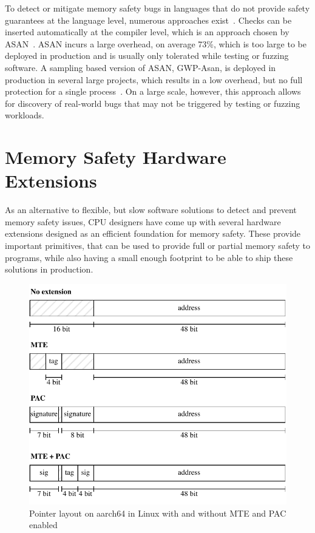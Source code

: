 To detect or mitigate memory safety bugs in languages that do not provide safety guarantees at the language level, numerous approaches exist~\cite{serebryany2012addresssanitizer,serebryany2023gwp,nethercote2007valgrind,serebryany2018memory}.
Checks can be inserted automatically at the compiler level, which is an approach chosen by \ac{ASAN}~\cite{serebryany2012addresssanitizer}.
\Ac{ASAN} incurs a large overhead, on average 73\%, which is too large to be deployed in production and is usually only tolerated while testing or fuzzing software.
A sampling based version of \ac{ASAN}, GWP-Asan, is deployed in production in several large projects, which results in a low overhead, but no full protection for a single process~\cite{serebryany2023gwp}.
On a large scale, however, this approach allows for discovery of real-world bugs that may not be triggered by testing or fuzzing workloads.

\section{Memory Safety Hardware Extensions}
\label{sec:memory-safety-hardware-extensions}

As an alternative to flexible, but slow software solutions to detect and prevent memory safety issues, CPU designers have come up with several hardware extensions designed as an efficient foundation for memory safety.
These provide important primitives, that can be used to provide full or partial memory safety to programs, while also having a small enough footprint to be able to ship these solutions in production.

\begin{figure}[t]
    \centering
    \includegraphics[scale=1]{figures/build/pointer-aarch64}
    \caption{Pointer layout on aarch64 in Linux with and without MTE and PAC enabled}
    \label{fig:aarch64-pointer}
\end{figure}

